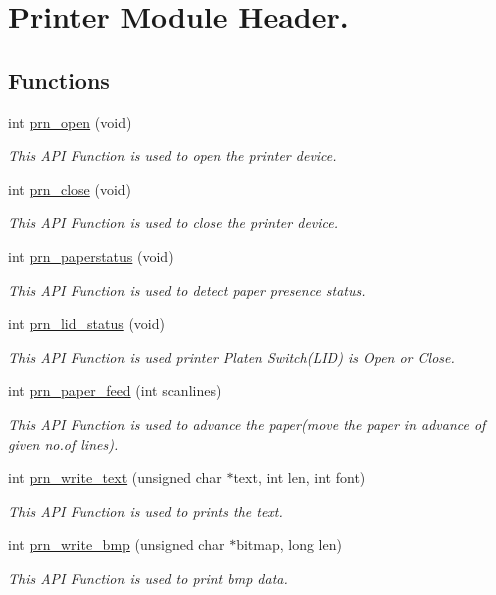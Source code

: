 \hypertarget{group__C}{\section{Printer Module Header.}
\label{group__C}
}
\subsection*{Functions}
\begin{DoxyCompactItemize}
\item 
int \hyperlink{group__C_ga65ae7f900c3b8201da211d9d878c1bda}{prn\+\_\+open} (void)
\begin{DoxyCompactList}\small\item\em This A\+P\+I Function is used to open the printer device. \end{DoxyCompactList}\item 
int \hyperlink{group__C_ga9b87dda400581e39e395c668d5bd9774}{prn\+\_\+close} (void)
\begin{DoxyCompactList}\small\item\em This A\+P\+I Function is used to close the printer device. \end{DoxyCompactList}\item 
int \hyperlink{group__C_gade0a5b30298701171427f9aba222ff1c}{prn\+\_\+paperstatus} (void)
\begin{DoxyCompactList}\small\item\em This A\+P\+I Function is used to detect paper presence status. \end{DoxyCompactList}\item 
int \hyperlink{group__C_ga1d831a3b1705a26fc967cd3d4b1e9178}{prn\+\_\+lid\+\_\+status} (void)
\begin{DoxyCompactList}\small\item\em This A\+P\+I Function is used printer Platen Switch(\+L\+I\+D) is Open or Close. \end{DoxyCompactList}\item 
int \hyperlink{group__C_ga1ea1a73d596e98f963fb19741749b5b3}{prn\+\_\+paper\+\_\+feed} (int scanlines)
\begin{DoxyCompactList}\small\item\em This A\+P\+I Function is used to advance the paper(move the paper in advance of given no.\+of lines). \end{DoxyCompactList}\item 
int \hyperlink{group__C_gabdeaa56253765c0daf7b08ebabd1238e}{prn\+\_\+write\+\_\+text} (unsigned char $\ast$text, int len, int font)
\begin{DoxyCompactList}\small\item\em This A\+P\+I Function is used to prints the text. \end{DoxyCompactList}\item 
int \hyperlink{group__C_ga99d653d0a5b9e666fe90877863175e87}{prn\+\_\+write\+\_\+bmp} (unsigned char $\ast$bitmap, long len)
\begin{DoxyCompactList}\small\item\em This A\+P\+I Function is used to print bmp data. \end{DoxyCompactList}\end{DoxyCompactItemize}


